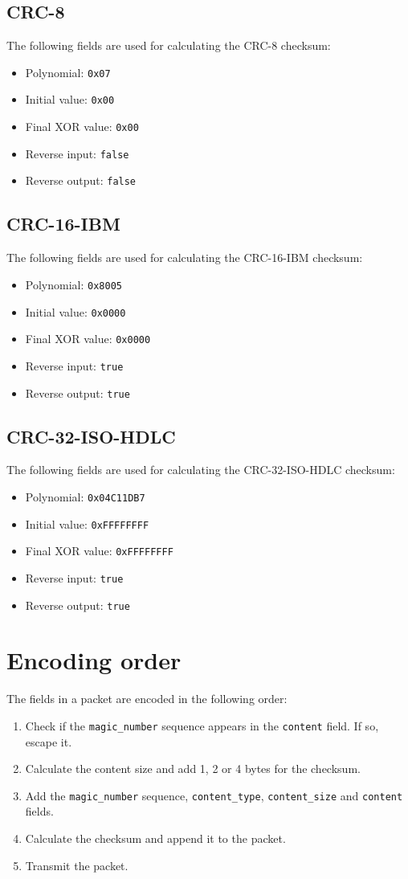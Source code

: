\documentclass[a4paper]{article}
\begin{document}
\subsection{CRC-8}
The following fields are used for calculating the CRC-8 checksum:
\begin{itemize}
  \item Polynomial: \texttt{0x07}
  \item Initial value: \texttt{0x00}
  \item Final XOR value: \texttt{0x00}
  \item Reverse input: \texttt{false}
  \item Reverse output: \texttt{false}
\end{itemize}

\subsection{CRC-16-IBM}
The following fields are used for calculating the CRC-16-IBM checksum:
\begin{itemize}
  \item Polynomial: \texttt{0x8005}
  \item Initial value: \texttt{0x0000}
  \item Final XOR value: \texttt{0x0000}
  \item Reverse input: \texttt{true}
  \item Reverse output: \texttt{true}
\end{itemize}

\subsection{CRC-32-ISO-HDLC}
The following fields are used for calculating the CRC-32-ISO-HDLC checksum:
\begin{itemize}
  \item Polynomial: \texttt{0x04C11DB7}
  \item Initial value: \texttt{0xFFFFFFFF}
  \item Final XOR value: \texttt{0xFFFFFFFF}
  \item Reverse input: \texttt{true}
  \item Reverse output: \texttt{true}
\end{itemize}

\section{Encoding order}
The fields in a packet are encoded in the following order:
\begin{enumerate}
  \item Check if the \texttt{magic\_number} sequence appears in the \texttt{content} field. If so, escape it.
  \item Calculate the content size and add 1, 2 or 4 bytes for the checksum.
  \item Add the \texttt{magic\_number} sequence, \texttt{content\_type}, \texttt{content\_size} and \texttt{content} fields.
  \item Calculate the checksum and append it to the packet.
  \item Transmit the packet.
\end{enumerate}
\end{document}
